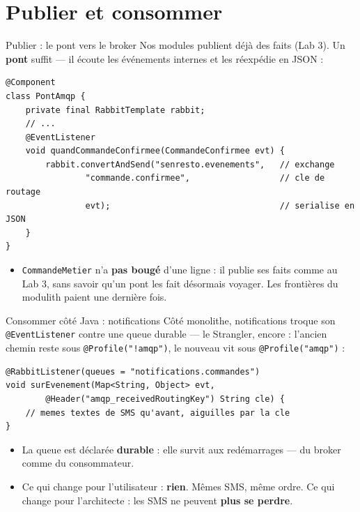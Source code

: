 \documentclass[aspectratio=169,11pt]{beamer}
\begin{document}
\section{Publier et consommer}

\begin{frame}[fragile]{Publier : le pont vers le broker}
{\small Nos modules publient déjà des faits (Lab 3). Un \textbf{pont} suffit — il écoute les événements internes et les réexpédie en JSON :}
\begin{lstlisting}
@Component
class PontAmqp {
    private final RabbitTemplate rabbit;
    // ...
    @EventListener
    void quandCommandeConfirmee(CommandeConfirmee evt) {
        rabbit.convertAndSend("senresto.evenements",   // exchange
                "commande.confirmee",                  // cle de routage
                evt);                                  // serialise en JSON
    }
}
\end{lstlisting}
\begin{itemize}\small
  \item \texttt{CommandeMetier} n'a \textbf{pas bougé} d'une ligne : il publie ses faits comme au Lab 3, sans savoir qu'un pont les fait désormais voyager. Les frontières du modulith paient une dernière fois.
\end{itemize}
\end{frame}

\begin{frame}[fragile]{Consommer côté Java : notifications}
{\small Côté monolithe, notifications troque son \texttt{@EventListener} contre une queue durable — le Strangler, encore : l'ancien chemin reste sous \texttt{@Profile("!amqp")}, le nouveau vit sous \texttt{@Profile("amqp")} :}
\begin{lstlisting}
@RabbitListener(queues = "notifications.commandes")
void surEvenement(Map<String, Object> evt,
        @Header("amqp_receivedRoutingKey") String cle) {
    // memes textes de SMS qu'avant, aiguilles par la cle
}
\end{lstlisting}
\begin{itemize}\small
  \item La queue est déclarée \textbf{durable} : elle survit aux redémarrages — du broker comme du consommateur.
  \item Ce qui change pour l'utilisateur : \textbf{rien}. Mêmes SMS, même ordre. Ce qui change pour l'architecte : les SMS ne peuvent \textbf{plus se perdre}.
\end{itemize}
\end{frame}
\end{document}
